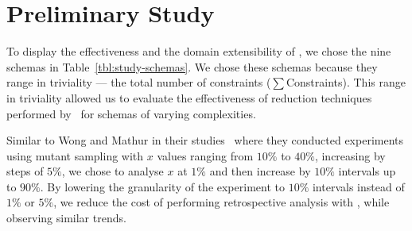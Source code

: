 \section{Preliminary Study}




To display the effectiveness and the domain extensibility of \mr, we chose the nine schemas in Table~\ref{tbl:study-schemas}.
We chose these schemas because they range in triviality --- the total number of constraints ({\small$\sum$Constraints}).
This range in triviality allowed us to evaluate the effectiveness of reduction techniques performed by \mr~for schemas of varying
complexities.

Similar to Wong and Mathur in their studies~\cite{mathur1994empirical, wong1993mutation} where they conducted experiments using
mutant sampling with $x$ values ranging from $10\%$ to $40\%$, increasing by steps of $5\%$, we chose to analyse $x$ at $1\%$ and
then increase by $10\%$ intervals up to $90\%$. By lowering the granularity of the experiment to $10\%$ intervals instead of $1\%$
or $5\%$, we reduce the cost of performing retrospective analysis with \mr, while observing similar trends.







